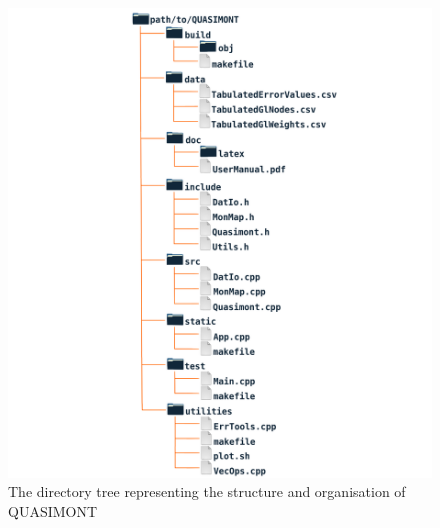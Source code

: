 \documentclass[a4paper, twosided]{book}
\begin{document}
\newpage
\begin{center}
        \begin{figure}[H]
        \centering
        \includegraphics[keepaspectratio,scale=0.30]{images/DirectoryStructureCentered.png}
        \caption{The directory tree representing the structure and organisation of QUASIMONT}
        \label{Fig2.1}
        \end{figure}
\end{center}
\end{document}
